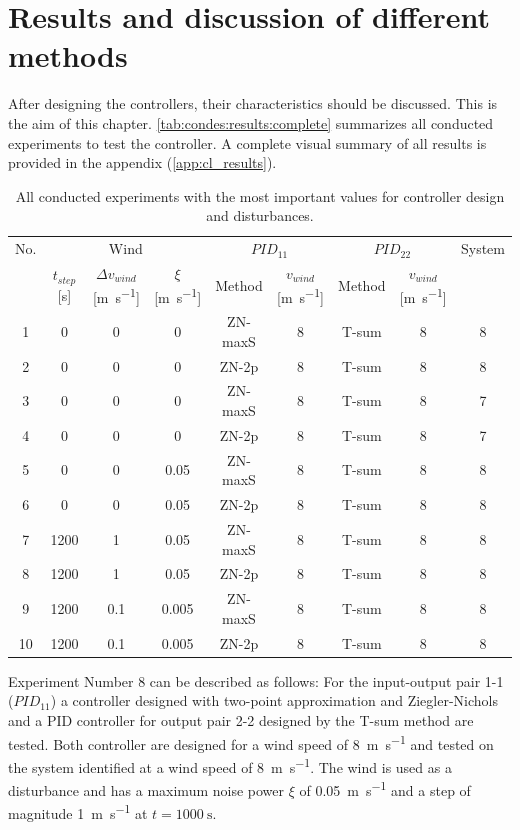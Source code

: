 \section{Results and discussion of different methods} \label{sec:condes:discussion}

After designing the controllers, their characteristics should be discussed.
This is the aim of this chapter.
\autoref{tab:condes:results:complete} summarizes all conducted experiments to test the controller.
A complete visual summary of all results is provided in the appendix (\autoref{app:cl_results}).


\begin{table}[H]
    \caption{All conducted experiments with the most important values for controller design and disturbances.}
    \centering
    \begin{tabular}{ccccccccc} \toprule
        No. & \multicolumn{3}{c}{Wind} & \multicolumn{2}{c}{$PID_{11}$} & \multicolumn{2}{c}{$PID_{22}$} & System \\ 
          &  $t_{step}$ [\si{\second}] & $ \Delta v_{wind}$ [\si{\metre\per\second}] & $\xi$ [\si{\metre\per\second}]    & Method  &  $v_{wind}$ [\si{\metre\per\second}] & Method  &  $v_{wind}$ [\si{\metre\per\second}]  \\ \midrule
        1 & 0 & 0 & 0 & ZN-maxS & 8 & T-sum & 8 & 8\\ 
        2 & 0 & 0 & 0 & ZN-2p   & 8 & T-sum & 8 & 8\\ 
        3 & 0 & 0 & 0 & ZN-maxS & 8 & T-sum & 8 & 7\\ 
        4 & 0 & 0 & 0 & ZN-2p   & 8 & T-sum & 8 & 7\\
        5 & 0 & 0 & 0.05 & ZN-maxS & 8 & T-sum & 8 & 8\\ 
        6 & 0 & 0 & 0.05 & ZN-2p   & 8 & T-sum & 8 & 8\\
        7 & 1200 & 1 & 0.05 & ZN-maxS & 8 & T-sum & 8 & 8\\ 
        8 & 1200 & 1 & 0.05 & ZN-2p   & 8 & T-sum & 8 & 8\\
        9 & 1200 & 0.1 & 0.005 & ZN-maxS & 8 & T-sum & 8 & 8\\ 
        10 & 1200 & 0.1 & 0.005 & ZN-2p   & 8 & T-sum & 8 & 8\\ \bottomrule
    \end{tabular}
    \label{tab:condes:results:complete}
\end{table}

Experiment Number 8 can be described as follows:
For the input-output pair 1-1 ($PID_{11}$) a controller designed with two-point approximation and Ziegler-Nichols and a PID controller for output pair 2-2 designed by the T-sum method are tested.
Both controller are designed for a wind speed of \SI{8}{\metre\per\second} and tested on the system identified at a wind speed of \SI{8}{\metre\per\second}.
The wind is used as a disturbance and has a maximum noise power $\xi$ of \SI{0.05}{\metre\per\second} and a step of magnitude \SI{1}{\metre\per\second} at $t=\SI{1000}{\second}$. 


